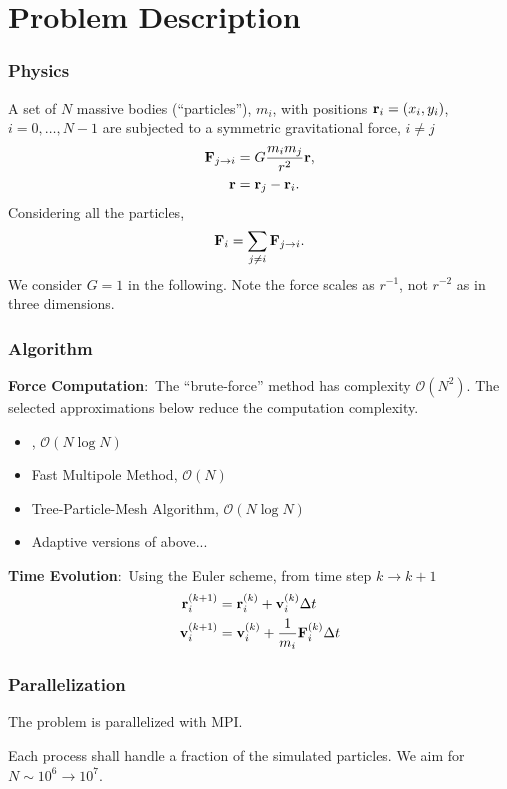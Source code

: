 \section{Problem Description}

\begin{frame}
	\frametitle{Physics}
	A set of $N$ massive bodies (``particles''), $m_i$, with positions $\mathbf{r}_i=(x_i,y_i)$, $i=0,\ldots,N-1$ are subjected to a symmetric gravitational force, $i\neq j$
	\begin{align*}
		\mathbf{F}_{j\rightarrow i} &= G\frac{m_im_j}{r^2}\mathbf{r},\\
		\mathbf{r} &= \mathbf{r}_j-\mathbf{r}_i.
	\end{align*}
	Considering all the particles,
	\begin{align*}
		\mathbf{F}_i = \sum_{j\neq i} \mathbf{F}_{j\rightarrow i}.
	\end{align*}
	We consider $G=1$ in the following. Note the force scales as $r^{-1}$, not $r^{-2}$ as in three dimensions.
\end{frame}

\begin{frame}
\frametitle{Algorithm}
\textbf{Force Computation}:~The ``brute-force'' method has complexity $\mathcal{O}(N^2)$. The selected approximations below reduce the computation complexity.
\begin{itemize}
	\item {}, $\mathcal{O}(N\log{N})$ \parencite{Barnes1986}
	\item Fast Multipole Method, $\mathcal{O}(N)$ \parencite{Rokhlin1985}
	\item Tree-Particle-Mesh Algorithm, $\mathcal{O}(N\log{N})$ \parencite{Bagla2002}
	\item Adaptive versions of above...
\end{itemize}
\pause
\textbf{Time Evolution}:~Using the \alert{Euler scheme}, from time step $k\to k+1$
\begin{align}
	\mathbf{r}^{(k+1)}_i &= \mathbf{r}^{(k)}_i + \mathbf{v}^{(k)}_i\Delta t\\
	\mathbf{v}^{(k+1)}_i &= \mathbf{v}^{(k)}_i + \frac{1}{m_i}\mathbf{F}^{(k)}_i\Delta t
\end{align}
\end{frame}

\begin{frame}
\frametitle{Parallelization}
The problem is parallelized with MPI.

Each process shall handle a fraction of the simulated particles. We aim for $N\sim10^6\to10^7$.
\end{frame}
